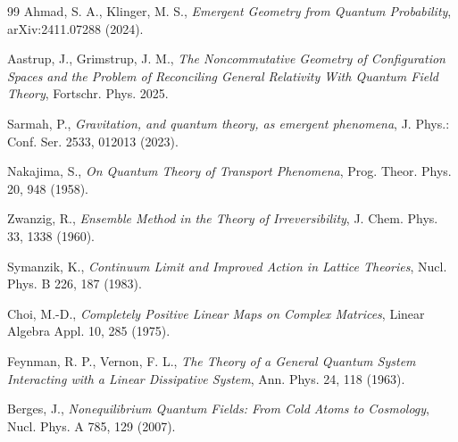 \documentclass[aps,prd,reprint,superscriptaddress,floatfix]{revtex4-2}
\begin{document}
\begin{thebibliography}{99}
Ahmad, S. A., Klinger, M. S., \emph{Emergent Geometry from Quantum Probability}, arXiv:2411.07288 (2024).

Aastrup, J., Grimstrup, J. M., \emph{The Noncommutative Geometry of Configuration Spaces and the Problem of Reconciling General Relativity With Quantum Field Theory}, Fortschr. Phys. 2025.

Sarmah, P., \emph{Gravitation, and quantum theory, as emergent phenomena}, J. Phys.: Conf. Ser. 2533, 012013 (2023).

Nakajima, S., \emph{On Quantum Theory of Transport Phenomena}, Prog. Theor. Phys. 20, 948 (1958).

Zwanzig, R., \emph{Ensemble Method in the Theory of Irreversibility}, J. Chem. Phys. 33, 1338 (1960).

Symanzik, K., \emph{Continuum Limit and Improved Action in Lattice Theories}, Nucl. Phys. B 226, 187 (1983).

Choi, M.-D., \emph{Completely Positive Linear Maps on Complex Matrices}, Linear Algebra Appl. 10, 285 (1975).

Feynman, R. P., Vernon, F. L., \emph{The Theory of a General Quantum System Interacting with a Linear Dissipative System}, Ann. Phys. 24, 118 (1963).

Berges, J., \emph{Nonequilibrium Quantum Fields: From Cold Atoms to Cosmology}, Nucl. Phys. A 785, 129 (2007).
\end{thebibliography}
\end{document}
